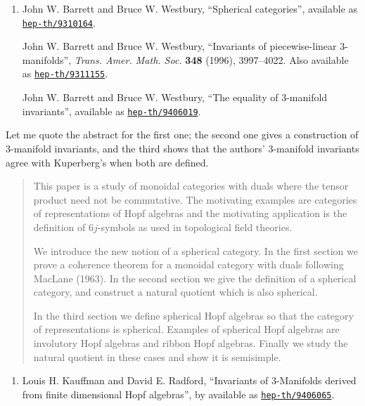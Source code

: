 \documentclass{article}
\def\tightlist{}
\begin{document}
\begin{enumerate}
\def\labelenumi{\arabic{enumi})}
\setcounter{enumi}{3}
\item
  John W. Barrett and Bruce W. Westbury, ``Spherical categories'',
  available as
  \href{http://xxx.lanl.gov/abs/hep-th/9310164}{\texttt{hep-th/9310164}}.

  John W. Barrett and Bruce W. Westbury, ``Invariants of
  piecewise-linear 3-manifolds'', \emph{Trans. Amer. Math. Soc.}
  \textbf{348} (1996), 3997--4022. Also available as
  \href{http://xxx.lanl.gov/abs/hep-th/9311155}{\texttt{hep-th/9311155}}.

  John W. Barrett and Bruce W. Westbury, ``The equality of 3-manifold
  invariants'', available as
  \href{http://xxx.lanl.gov/abs/hep-th/9406019}{\texttt{hep-th/9406019}}.
\end{enumerate}

Let me quote the abstract for the first one; the second one gives a
construction of 3-manifold invariants, and the third shows that the
authors' 3-manifold invariants agree with Kuperberg's when both are
defined.

\begin{quote}
This paper is a study of monoidal categories with duals where the tensor
product need not be commutative. The motivating examples are categories
of representations of Hopf algebras and the motivating application is
the definition of \(6j\)-symbols as used in topological field theories.

We introduce the new notion of a spherical category. In the first
section we prove a coherence theorem for a monoidal category with duals
following MacLane (1963). In the second section we give the definition
of a spherical category, and construct a natural quotient which is also
spherical.

In the third section we define spherical Hopf algebras so that the
category of representations is spherical. Examples of spherical Hopf
algebras are involutory Hopf algebras and ribbon Hopf algebras. Finally
we study the natural quotient in these cases and show it is semisimple.
\end{quote}

\begin{enumerate}
\def\labelenumi{\arabic{enumi})}
\setcounter{enumi}{4}
\tightlist
\item
  Louis H. Kauffman and David E. Radford, ``Invariants of 3-Manifolds
  derived from finite dimensional Hopf algebras'', by available as
  \href{http://xxx.lanl.gov/abs/hep-th/9406065}{\texttt{hep-th/9406065}}.
\end{enumerate}
\end{document}
